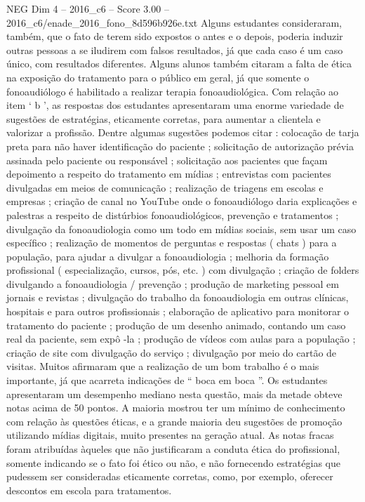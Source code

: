 \begin{textsample}{NEG Dim 4 – 2016\_c6 – Score 3.00 – 2016\_c6/enade\_2016\_fono\_8d596b926e.txt}
Alguns estudantes consideraram, também, que o fato de terem sido expostos o antes e o depois, poderia induzir outras pessoas a se iludirem com falsos resultados, já que cada caso é um caso único, com resultados diferentes.
Alguns alunos também citaram a falta de ética na exposição do tratamento para o público em geral, já que somente o fonoaudiólogo é habilitado a realizar terapia fonoaudiológica.
Com relação ao item ‘ b ’, as respostas dos estudantes apresentaram uma enorme variedade de sugestões de estratégias, eticamente corretas, para aumentar a clientela e valorizar a profissão.
Dentre algumas sugestões podemos citar : colocação de tarja preta para não haver identificação do paciente ; solicitação de autorização prévia assinada pelo paciente ou responsável ; solicitação aos pacientes que façam depoimento a respeito do tratamento em mídias ; entrevistas com pacientes divulgadas em meios de comunicação ; realização de triagens em escolas e empresas ; criação de canal no YouTube onde o fonoaudiólogo daria explicações e palestras a respeito de distúrbios fonoaudiológicos, prevenção e tratamentos ; divulgação da fonoaudiologia como um todo em mídias sociais, sem usar um caso específico ; realização de momentos de perguntas e respostas ( chats ) para a população, para ajudar a divulgar a fonoaudiologia ; melhoria da formação profissional ( especialização, cursos, pós, etc. ) com divulgação ; criação de folders divulgando a fonoaudiologia / prevenção ; produção de marketing pessoal em jornais e revistas ; divulgação do trabalho da fonoaudiologia em outras clínicas, hospitais e para outros profissionais ; elaboração de aplicativo para monitorar o tratamento do paciente ; produção de um desenho animado, contando um caso real da paciente, sem expô -la ; produção de vídeos com aulas para a população ; criação de site com divulgação do serviço ; divulgação por meio do cartão de visitas.
Muitos afirmaram que a realização de um bom trabalho é o mais importante, já que acarreta indicações de “ boca em boca ”.
Os estudantes apresentaram um desempenho mediano nesta questão, mais da metade obteve notas acima de 50 pontos.
A maioria mostrou ter um mínimo de conhecimento com relação às questões éticas, e a grande maioria deu sugestões de promoção utilizando mídias digitais, muito presentes na geração atual.
As notas fracas foram atribuídas àqueles que não justificaram a conduta ética do profissional, somente indicando se o fato foi ético ou não, e não fornecendo estratégias que pudessem ser consideradas eticamente corretas, como, por exemplo, oferecer descontos em escola para tratamentos.

\end{textsample}
